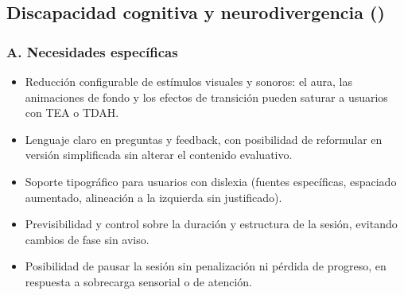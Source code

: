 \subsection{Discapacidad cognitiva y neurodivergencia ()}

\subsubsection*{A. Necesidades específicas}
\begin{itemize}
  \item Reducción configurable de estímulos visuales y sonoros: el
        aura, las animaciones de fondo y los efectos de transición
        pueden saturar a usuarios con TEA o TDAH.
  \item Lenguaje claro en preguntas y feedback, con posibilidad de
        reformular en versión simplificada sin alterar el contenido
        evaluativo.
  \item Soporte tipográfico para usuarios con dislexia (fuentes
        específicas, espaciado aumentado, alineación a la izquierda
        sin justificado).
  \item Previsibilidad y control sobre la duración y estructura de la
        sesión, evitando cambios de fase sin aviso.
  \item Posibilidad de pausar la sesión sin penalización ni pérdida de
        progreso, en respuesta a sobrecarga sensorial o de atención.
\end{itemize}

